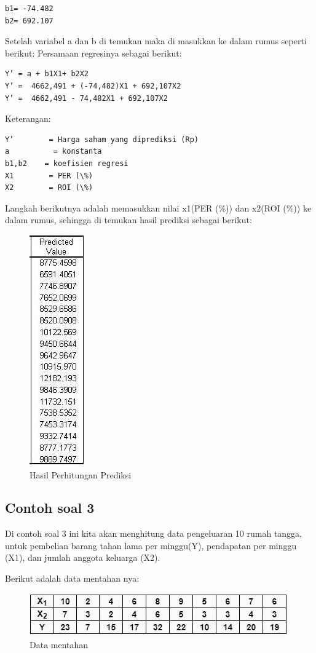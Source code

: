 \begin{lstlisting}
b1= -74.482
b2= 692.107
\end{lstlisting}
Setelah variabel a dan b di temukan maka di masukkan ke dalam rumus seperti berikut: 
Persamaan regresinya sebagai berikut:
\begin{lstlisting}
Y’ = a + b1X1+ b2X2
Y’ =  4662,491 + (-74,482)X1 + 692,107X2
Y’ =  4662,491 - 74,482X1 + 692,107X2
\end{lstlisting}
Keterangan:
\begin{lstlisting}
Y’        = Harga saham yang diprediksi (Rp)
a          = konstanta
b1,b2    = koefisien regresi
X1        = PER (\%)
X2        = ROI (\%)
\end{lstlisting}
\par Langkah berikutnya adalah memasukkan nilai x1(PER (\%)) dan x2(ROI (\%)) ke dalam rumus, sehingga di temukan hasil prediksi sebagai berikut:
\begin{figure}[!htbp]
    \centering
    \includegraphics[scale=0.6]{chapters/figures/cs3.JPG}
    \caption{Hasil Perhitungan Prediksi}
\end{figure}
\newpage \subsection{Contoh soal 3}
\par Di contoh soal 3 ini kita akan menghitung data pengeluaran 10 rumah tangga, untuk pembelian barang tahan lama per minggu(Y), pendapatan per minggu (X1), dan jumlah anggota keluarga (X2).
\par Berikut adalah data mentahan nya:
\begin{figure}[!htbp]
    \centering
    \includegraphics[scale=0.7]{chapters/figures/css.JPG}
    \caption{Data mentahan}
\end{figure}


